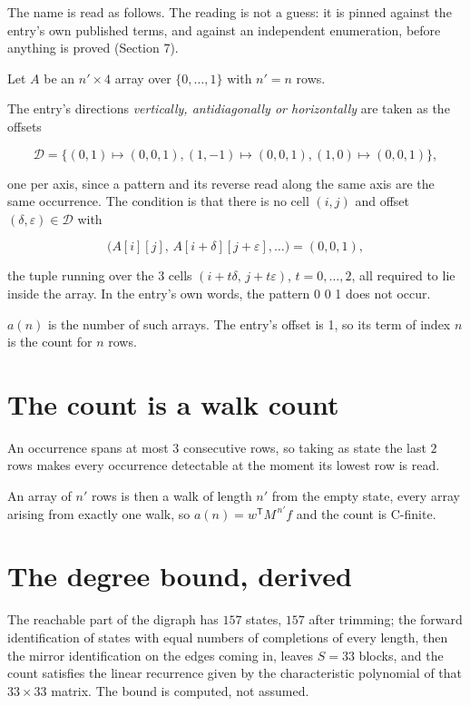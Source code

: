 \documentclass[11pt]{article}
\theoremstyle{definition}
\begin{document}
The name is read as follows. The reading is not a guess: it is pinned against the entry's own published terms, and against an independent enumeration, before anything is proved (Section 7).

Let $A$ be an $n' \times 4$ array over $\{0,\dots,1\}$ with $n' = n$ rows.

The entry's directions {\itshape vertically, antidiagonally or horizontally} are taken as the offsets

\[\mathcal{D} = \{(0,1)\mapsto(0,0,1), (1,-1)\mapsto(0,0,1), (1,0)\mapsto(0,0,1)\},\]

one per axis, since a pattern and its reverse read along the same axis are the same occurrence. The condition is that there is no cell $(i,j)$ and offset $(\delta,\varepsilon)\in\mathcal{D}$ with

\[\bigl(A[i][j],\,A[i{+}\delta][j{+}\varepsilon],\dots\bigr) = (0, 0, 1),\]

the tuple running over the $3$ cells $(i+t\delta,\,j+t\varepsilon)$, $t = 0,\dots,2$, all required to lie inside the array. In the entry's own words, the pattern 0 0 1 does not occur.

$a(n)$ is the number of such arrays. The entry's offset is 1, so its term of index $n$ is the count for $n$ rows.

\section{The count is a walk count}

An occurrence spans at most $3$ consecutive rows, so taking as state the last $2$ rows makes every occurrence detectable at the moment its lowest row is read.

An array of $n'$ rows is then a walk of length $n'$ from the empty state, every array arising from exactly one walk, so $a(n) = w^{\mathsf T}M^{\,n'}f$ and the count is C-finite.

\section{The degree bound, derived}

The reachable part of the digraph has $157$ states, $157$ after trimming; the forward identification of states with equal numbers of completions of every length, then the mirror identification on the edges coming in, leaves $S = 33$ blocks, and the count satisfies the linear recurrence given by the characteristic polynomial of that $33\times33$ matrix. The bound is computed, not assumed.
\end{document}
